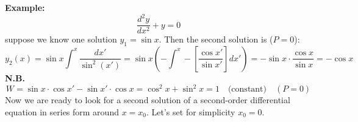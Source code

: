 \documentclass{article}
\begin{document}
\newpage
\noindent
\textbf{Example:}
\begin{equation}
    \frac{d^2 y}{dx^2} + y = 0
\end{equation}
suppose we know one solution $y_1 = \sin{x}$. Then the second solution is ($P=0$):
\begin{equation}
    y_2(x) = \sin x \int^x \frac{dx'}{\sin^2(x')} 
= \sin x \left( -\int^x - \left[ \frac{\cos x'}{\sin x'} \right] dx' \right)
= -\sin x \cdot \frac{\cos x}{\sin x} = -\cos x
\end{equation}
\textbf{N.B.}
\begin{equation}
    W = \sin x \cdot \cos x' - \sin x' \cdot \cos x 
= \cos^2 x + \sin^2 x = 1 \quad \text{(constant)} \quad (P = 0)
\end{equation}
Now we are ready to look for a second solution of a second-order differential equation in series form around $x=x_0$. Let’s set for simplicity $x_0=0$.
\end{document}
